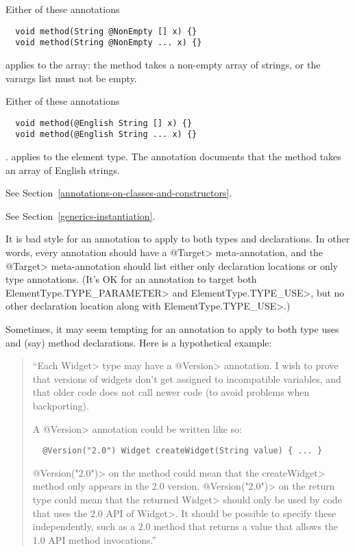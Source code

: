 Either of these annotations

\begin{Verbatim}
  void method(String @NonEmpty [] x) {}
  void method(String @NonEmpty ... x) {}
\end{Verbatim}

\noindent
applies to the array:  the method takes a non-empty array of strings, or
the varargs list must not be empty.

Either of these annotations

\begin{Verbatim}
  void method(@English String [] x) {}
  void method(@English String ... x) {}
\end{Verbatim}

\noindent.
applies to the element type. The annotation documents that the method takes an array of English strings.



See Section~\ref{annotations-on-classes-and-constructors}.



See Section~\ref{generics-instantiation}.



It is bad style for an annotation to apply to both types and declarations.
In other words, every annotation should have a \<@Target> meta-annotation,
and the \<@Target> meta-annotation should list either only declaration
locations or only type annotations.  (It's OK for an annotation to target
both \<ElementType.TYPE\_PARAMETER> and \<ElementType.TYPE\_USE>, but no
other declaration location along with \<ElementType.TYPE\_USE>.)

Sometimes, it may seem tempting for an annotation to apply to both type
uses and (say) method declarations.  Here is a hypothetical example:

\begin{quote}
  ``Each \<Widget> type may have a \<@Version> annotation.
  I wish to prove that versions of widgets don't get assigned to
  incompatible variables, and that older code does not call newer code (to
  avoid problems when backporting).

  A \<@Version> annotation could be written like so:

\begin{Verbatim}
  @Version("2.0") Widget createWidget(String value) { ... }
\end{Verbatim}

\<@Version("2.0")> on the method could mean that the \<createWidget> method
only appears in the 2.0 version.  \<@Version("2.0")> on the return type
could mean that the returned \<Widget> should only be used by code that
uses the 2.0 API of \<Widget>.  It should be possible to specify these
independently, such as a 2.0 method that returns a value that allows the
1.0 API method invocations.''
\end{quote}

